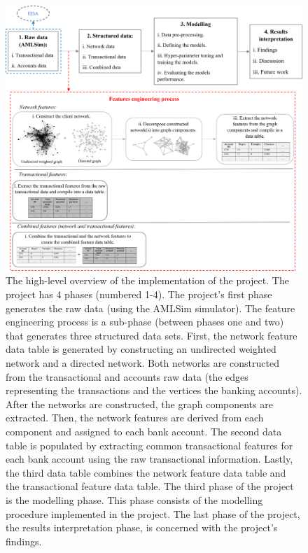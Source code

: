 \begin{figure}
	\begin{center}
		\includegraphics[scale=0.75]{fig/CH1/proposed_project_framework.png}
		\caption{The high-level overview of the implementation of the project. The project has 4 phases (numbered 1-4). The project's first phase generates the raw data (using the AMLSim simulator). The feature engineering process is a sub-phase (between phases one and two) that generates three structured data sets. First, the network feature data table is generated by constructing an undirected weighted network and a directed network. Both networks are constructed from the transactional and accounts raw data (the edges representing the transactions and the vertices the banking accounts). After the networks are constructed, the graph components are extracted. Then, the network features are derived from each component and assigned to each bank account. The second data table is populated by extracting common transactional features for each bank account using the raw transactional information. Lastly, the third data table combines the network feature data table and the transactional feature data table. The third phase of the project is the modelling phase. This phase consists of the modelling procedure implemented in the project. The last phase of the project, the results interpretation phase, is concerned with the project's findings.}
		\label{fig:ch1_project_framework}
	\end{center}	
\end{figure}

